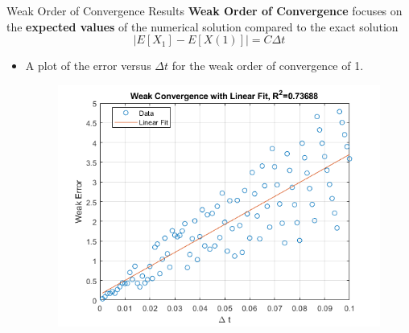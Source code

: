 \documentclass[compress,12pt]{beamer}
\begin{document}
\begin{frame}{Weak Order of Convergence Results}
    \textbf{Weak Order of Convergence} focuses on the \textbf{expected values} of the numerical solution compared to the exact solution
    \[
    |E[X_1]-E[X(1)]|=C\Delta t 
    \]
    
    \begin{itemize}
        \item A plot of the error versus \(\Delta t\) for the  weak order of convergence of 1. 
        \begin{figure}[H]
            \centering
            \includegraphics[scale=0.4]{fig1.png}
            \label{fig:3a}
       \end{figure}
        
    \end{itemize}
\end{frame}
\end{document}
